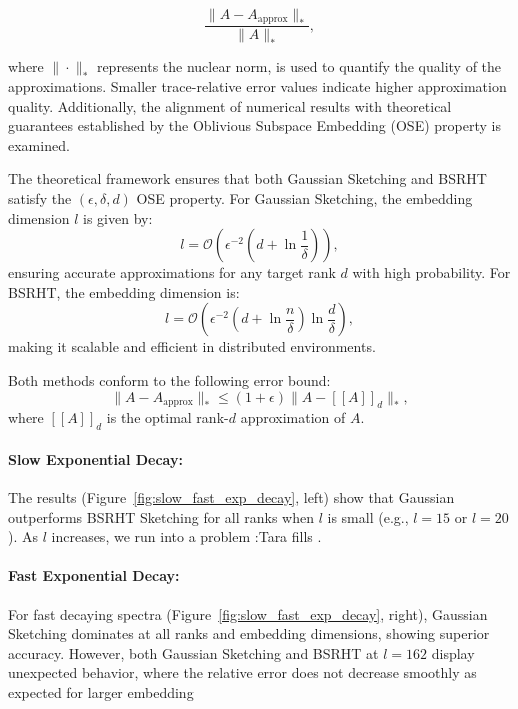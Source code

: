 \documentclass[a4paper, 12pt,oneside]{article}
\begin{document}
		\begin{equation}
		\frac{\|A - A_{\text{approx}}\|_*}{\|A\|_*},
		\end{equation}
		
		where $\|\cdot\|_*$ represents the nuclear norm, is used to quantify the quality of the approximations. Smaller trace-relative error values indicate higher approximation quality. Additionally, the alignment of numerical results with theoretical guarantees established by the Oblivious Subspace Embedding (OSE) property is examined.
		
		The theoretical framework ensures that both Gaussian Sketching and BSRHT satisfy the $(\epsilon, \delta, d)$ OSE property. For Gaussian Sketching, the embedding dimension $l$ is given by:
		\begin{equation}
		l = \mathcal{O}\left(\epsilon^{-2}(d + \ln \frac{1}{\delta})\right),
		\end{equation}
		ensuring accurate approximations for any target rank $d$ with high probability. For BSRHT, the embedding dimension is:
		\begin{equation}
		l = \mathcal{O}\left(\epsilon^{-2}(d + \ln \frac{n}{\delta}) \ln \frac{d}{\delta}\right),
		\end{equation}
		making it scalable and efficient in distributed environments.
		
		Both methods conform to the following error bound:
		\begin{equation}
		\|A - A_{\text{approx}}\|_* \leq (1 + \epsilon) \|A - [[A]]_d\|_*,
		\end{equation}
		where $[[A]]_d$ is the optimal rank-$d$ approximation of $A$.
		\paragraph{Slow Exponential Decay:}
The results (Figure~\ref{fig:slow_fast_exp_decay}, left) show that Gaussian outperforms BSRHT Sketching for all ranks when $l$ is small (e.g., $l = 15$ or $l = 20$). 
As $l$ increases, we run into a problem :Tara fills . 


\paragraph{Fast Exponential Decay:}
For fast decaying spectra (Figure~\ref{fig:slow_fast_exp_decay}, right), Gaussian Sketching dominates at all ranks and embedding dimensions, showing superior accuracy. However, both Gaussian Sketching and BSRHT at $l=162$ display unexpected behavior, where the relative error does not decrease smoothly as expected for larger embedding 
\end{document}
